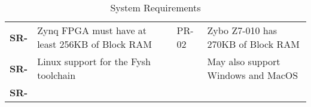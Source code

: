 \resetfyshcounter
\newcommand{\sr}[4]{
	\textbf{SR-\rc} & #1 & #2 & #3 & #4 \\
	\hline
}
\begin{table}[H]
	\begin{tabularx}{\textwidth}{| a | x | a | a | a |}
		\hline

		 &  %
		           &                           %
		           &                           %
		           &                           \\
		\hline
		\sr{Zynq FPGA must have at least 256KB of Block RAM}%
		{}%
		{PR-02}%
		{Zybo Z7-010 has 270KB of Block RAM} %

		\sr{Linux support for the Fysh toolchain}%
		{}%
		{}%
		{May also support Windows and MacOS}

		\sr{}%
		{}%
		{}%
		{}
	\end{tabularx}
	\caption{System Requirements}
\end{table}

